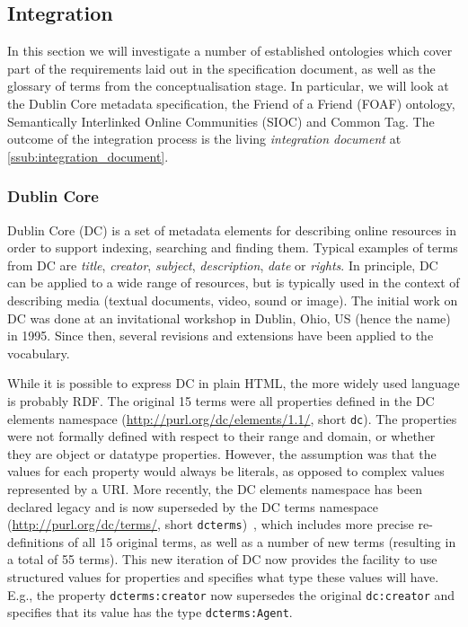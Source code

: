 \documentclass{article}
\begin{document}

\subsection{Integration} %
\label{sub:integration}

In this section we will investigate a number of established ontologies which cover part of the requirements laid out in the specification document, as well as the glossary of terms from the conceptualisation stage. In particular, we will look at the Dublin Core metadata specification, the Friend of a Friend (FOAF) ontology, Semantically Interlinked Online Communities (SIOC)  and Common Tag. 
The outcome of the integration process is the living \emph{integration document} at \ref{ssub:integration_document}.

\subsubsection{Dublin Core} %
\label{ssub:dublin_core}

Dublin Core (DC) is a set of metadata elements for describing online resources in order to support indexing, searching and finding them. Typical examples of terms from DC are \emph{title}, \emph{creator}, \emph{subject}, \emph{description}, \emph{date} or \emph{rights}. In principle, DC can be applied to a wide range of resources, but is typically used in the context of describing media (textual documents, video, sound or image). The initial work on DC was done at an invitational workshop in Dublin, Ohio, US (hence the name) in 1995. Since then, several revisions and extensions have been applied to the vocabulary.

While it is possible to express DC in plain HTML, the more widely used language is probably RDF. The original 15 terms were all properties defined in the DC elements namespace (\url{http://purl.org/dc/elements/1.1/}, short \texttt{dc}). The properties were not formally defined with respect to their range and domain, or whether they are object or datatype properties. However, the assumption was that the values for each property would always be literals, as opposed to complex values represented by a URI. More recently, the DC elements namespace has been declared legacy and is now superseded by the DC terms namespace (\url{http://purl.org/dc/terms/}, short \texttt{dcterms})~\cite{dcterms2008}, which includes more precise re-definitions of all 15 original terms, as well as a number of new terms (resulting in a total of 55 terms). This new iteration of DC now provides the facility to use structured values for properties and specifies what type these values will have. E.g., the property \texttt{dcterms:creator} now supersedes the original \texttt{dc:creator} and specifies that its value has the type \texttt{dcterms:Agent}.
\end{document}
